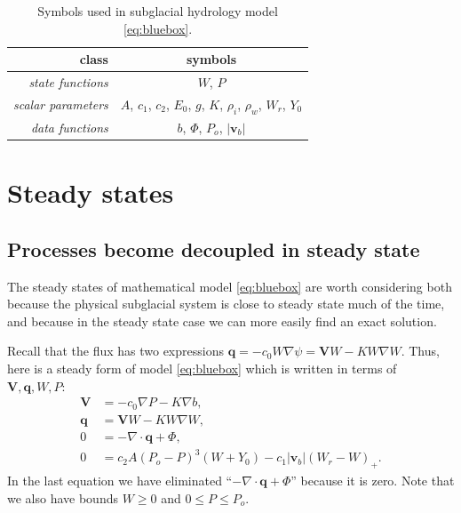 \documentclass[11pt,final]{amsart}%
\newcommand\bv{\mathbf{v}}
\newcommand\bV{\mathbf{V}}
\newcommand\bq{\mathbf{q}}
\newcommand{\Div}{\nabla\cdot}
\newcommand{\grad}{\nabla}
\begin{document}
\begin{table}[ht]
\caption{Symbols used in subglacial hydrology model \eqref{eq:bluebox}.}
\begin{tabular}{r|c}
class & symbols \\ \hline
\emph{state functions} & $W$, $P$ \\
\emph{scalar parameters} & $A$, $c_1$, $c_2$, $E_0$, $g$, $K$, $\rho_i$, $\rho_w$, $W_r$, $Y_0$ \\
\emph{data functions} & $b$, $\Phi$, $P_o$, $|\bv_b|$ \\
\hline
\end{tabular}
\label{tab:symbols}
\end{table}


\section{Steady states}  \label{sec:steadyverif}

\subsection*{Processes become decoupled in steady state}  The steady states of mathematical model \eqref{eq:bluebox} are worth considering both because the physical subglacial system is close to steady state much of the time, and because in the steady state case we can more easily find an exact solution.

Recall that the flux has two expressions $\bq = - c_0 W \grad \psi = \bV W - K W \grad W$.  Thus, here is a steady form of model \eqref{eq:bluebox} which is written in terms of $\bV,\bq,W,P$:
\begin{align}
\bV &= - c_0 \grad P - K \grad b, \label{eq:Vsteady} \\
\bq &= \bV W - K W \grad W, \label{eq:qsteady} \\
0 &= - \Div \bq + \Phi, \label{eq:masscontsteady} \\
0 &= c_2 A (P_o - P)^3 (W+Y_0) - c_1 |\bv_b| (W_r - W)_+. \label{eq:openclosesteady}
\end{align}
In the last equation we have eliminated ``$- \Div \bq + \Phi$'' because it is zero.  Note that we also have bounds $W\ge 0$ and $0 \le P \le P_o$.
\end{document}
